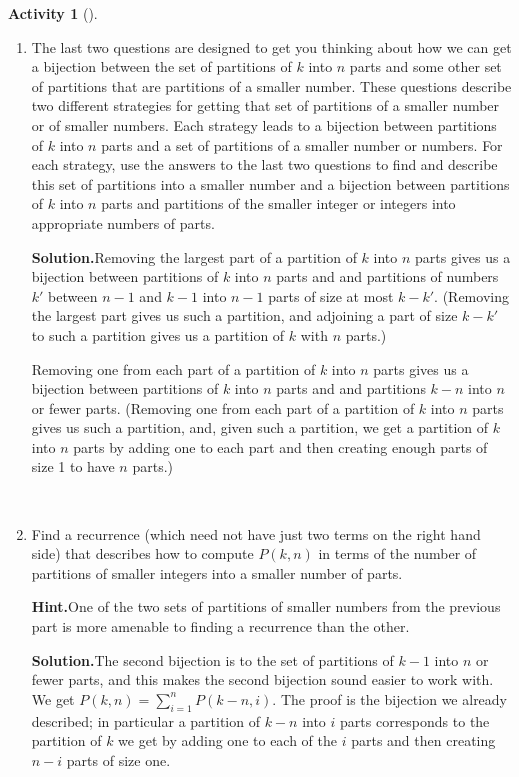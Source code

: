 \documentclass[10pt,]{book}
\theoremstyle{plain}
\theoremstyle{definition}
\newtheorem{activity}[project]{Activity}
\numberwithin{equation}{chapter}
\begin{document}
\begin{activity}[]
\begin{enumerate}[label=(\alph*)]
~\par
\item The last two questions are designed to get you thinking about how we can get a bijection between the set of partitions of \(k\) into \(n\) parts and some other set of partitions that are partitions of a smaller number.  These questions describe two different strategies for getting that set of partitions of a smaller number or of smaller numbers.  Each strategy leads to a bijection between partitions of \(k\) into \(n\) parts and a set of partitions of a smaller number or numbers.  For each strategy, use the answers to the last two questions to find and describe this set of partitions into a smaller number and a bijection between partitions of \(k\) into \(n\) parts and partitions of the smaller integer or integers into appropriate numbers of parts.%
\par\medskip\noindent%
\textbf{Solution.}\quad Removing the largest part of a partition of \(k\) into \(n\) parts gives us a bijection between partitions of \(k\) into \(n\) parts and and partitions of numbers \(k'\) between \(n-1\) and \(k-1\) into \(n-1\) parts of size at most \(k-k'\). (Removing the largest part gives us such a partition, and adjoining a part of size \(k-k'\) to such a partition gives us a partition of \(k\) with \(n\) parts.)%
\par
Removing one from each part of a partition of \(k\) into \(n\) parts gives us a bijection between partitions of \(k\) into \(n\) parts and and partitions \(k-n\) into \(n\) or fewer parts. (Removing one from each part of a partition of \(k\) into \(n\) parts gives us such a partition, and, given such a partition, we get a partition of \(k\) into \(n\) parts by adding one to each part and then creating enough parts of size 1 to have \(n\) parts.)%

~\par
\item Find a recurrence (which need not have just two terms on the right hand side) that describes how to compute \(P(k,n)\) in terms of the number of partitions of smaller integers into a smaller number of parts.%
\par\medskip\noindent%
\textbf{Hint.}\quad One of the two sets of partitions of smaller numbers from the previous part is more amenable to finding a recurrence than the other.%
\par\medskip\noindent%
\textbf{Solution.}\quad The second bijection is to the set of partitions of \(k-1\) into \(n\) or fewer parts, and this makes the second bijection sound easier to work with. We get \(P(k,n)=\sum_{i=1}^n P(k-n,i)\). The proof is the bijection we already described; in particular a partition of \(k-n\) into \(i\) parts corresponds to the partition of \(k\) we get by adding one to each of the \(i\) parts and then creating \(n-i\) parts of size one.%


\end{enumerate}
\end{activity}
\end{document}

